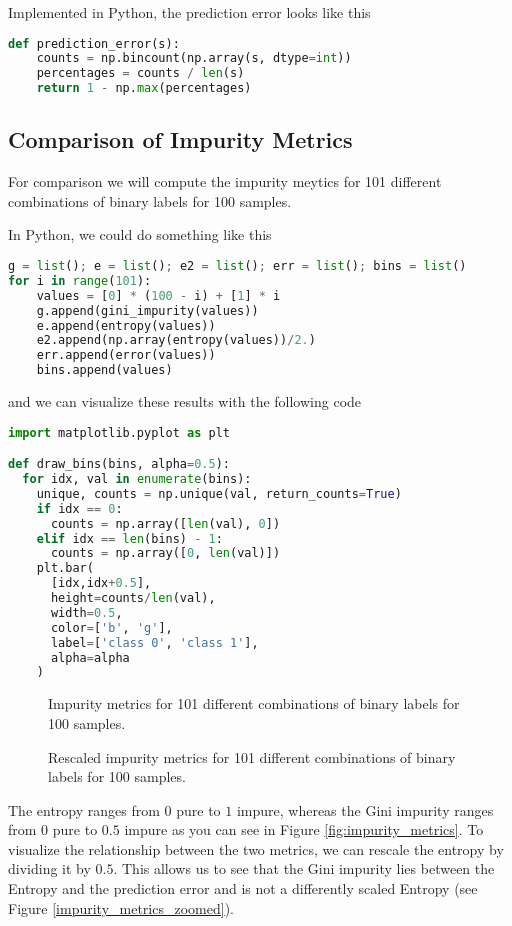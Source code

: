 Implemented in Python, the prediction error looks like this
\begin{lstlisting}[language=Python]
def prediction_error(s):
    counts = np.bincount(np.array(s, dtype=int))
    percentages = counts / len(s)
    return 1 - np.max(percentages)
\end{lstlisting}

\subsection{Comparison of Impurity Metrics}
For comparison we will compute the impurity meytics for 101 different combinations of binary labels for 100 samples.

In Python, we could do something like this
\begin{lstlisting}[language=Python]
g = list(); e = list(); e2 = list(); err = list(); bins = list()
for i in range(101):
    values = [0] * (100 - i) + [1] * i
    g.append(gini_impurity(values))
    e.append(entropy(values))
    e2.append(np.array(entropy(values))/2.)
    err.append(error(values))
    bins.append(values)
\end{lstlisting}
and we can visualize these results with the following code
\begin{lstlisting}[language=Python]
import matplotlib.pyplot as plt

def draw_bins(bins, alpha=0.5):
  for idx, val in enumerate(bins):
    unique, counts = np.unique(val, return_counts=True)
    if idx == 0:
      counts = np.array([len(val), 0])
    elif idx == len(bins) - 1:
      counts = np.array([0, len(val)])
    plt.bar(
      [idx,idx+0.5],
      height=counts/len(val),
      width=0.5,
      color=['b', 'g'],
      label=['class 0', 'class 1'],
      alpha=alpha
    )
\end{lstlisting}
\begin{figure}[ht]
  \begin{minipage}{0.5\textwidth}
    \centering
    
    \caption{Impurity metrics for 101 different combinations of binary labels for 100 samples.}
    \label{fig:impurity_metrics}
  \end{minipage}
  \begin{minipage}{0.5\textwidth}
    \centering
    
    \caption{Rescaled impurity metrics for 101 different combinations of binary labels for 100 samples.}
    \label{fig:impurity_metrics_zoomed}
  \end{minipage}
\end{figure}
The entropy ranges from $0$ pure to $1$ impure, whereas the Gini impurity ranges from $0$ pure to $0.5$ impure as you can see in Figure \ref{fig:impurity_metrics}.
To visualize the relationship between the two metrics, we can rescale the entropy by dividing it by $0.5$. 
This allows us to see that the Gini impurity lies between the Entropy and the prediction error and is not a differently scaled Entropy (see Figure \ref{impurity_metrics_zoomed}).

